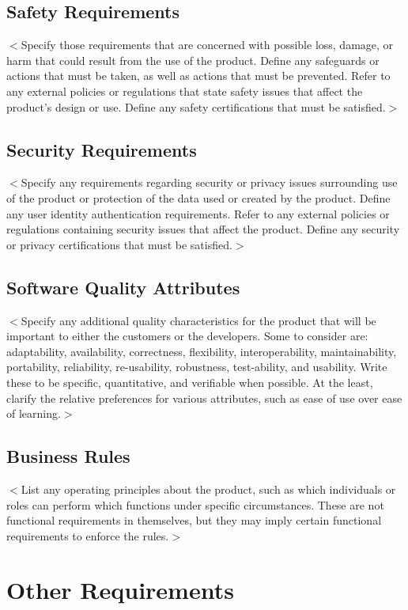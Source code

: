 \documentclass{scrreprt}
\begin{document}
\section{Safety Requirements}
$<$Specify those requirements that are concerned with possible loss, damage, or 
harm that could result from the use of the product. Define any safeguards or 
actions that must be taken, as well as actions that must be prevented. Refer to 
any external policies or regulations that state safety issues that affect the 
product’s design or use. Define any safety certifications that must be 
satisfied.$>$

\section{Security Requirements}
$<$Specify any requirements regarding security or privacy issues surrounding use 
of the product or protection of the data used or created by the product. Define 
any user identity authentication requirements. Refer to any external policies or 
regulations containing security issues that affect the product. Define any 
security or privacy certifications that must be satisfied.$>$

\section{Software Quality Attributes}
$<$Specify any additional quality characteristics for the product that will be 
important to either the customers or the developers. Some to consider are: 
adaptability, availability, correctness, flexibility, interoperability, 
maintainability, portability, reliability, re-usability, robustness, test-ability, 
and usability. Write these to be specific, quantitative, and verifiable when 
possible. At the least, clarify the relative preferences for various attributes, 
such as ease of use over ease of learning.$>$

\section{Business Rules}
$<$List any operating principles about the product, such as which individuals or 
roles can perform which functions under specific circumstances. These are not 
functional requirements in themselves, but they may imply certain functional 
requirements to enforce the rules.$>$


\chapter{Other Requirements}
\end{document}
